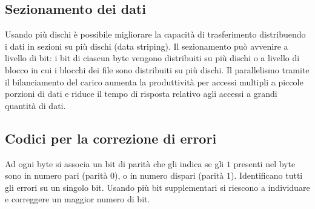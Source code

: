 \subsection{Sezionamento dei dati}
Usando pi\`u dischi \`e possibile migliorare la capacit\`a di trasferimento distribuendo i dati in sezioni su pi\`u dischi (data striping). Il sezionamento pu\`o avvenire a livello di 
bit: i bit di ciascun byte vengono distribuiti su pi\`u dischi o a livello di blocco in cui i blocchi dei file sono distribuiti su pi\`u dischi. Il parallelismo tramite il bilanciamento
del carico aumenta la produttivit\`a per accessi multipli a piccole porzioni di dati e riduce il tempo di risposta relativo agli accessi a grandi quantit\`a di dati. 
\subsection{Codici per la correzione di errori}
Ad ogni byte si associa un bit di parit\`a che gli indica se gli $1$ presenti nel byte sono in numero pari (parit\`a $0$), o in numero dispari (parit\`a $1$). Identificano tutti gli 
errori su un singolo bit. Usando pi\`u bit supplementari si riescono a individuare e correggere un maggior numero di bit. 
